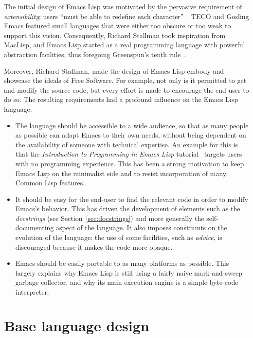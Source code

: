 \documentclass[format=acmsmall, review]{acmart}
\newcommand \Elisp {Emacs Lisp}
\begin{document}
The initial design of \Elisp{} was motivated by the pervasive
requirement of \emph{extensibility}; users ``must be able to
redefine each character''~\cite{Stallman1981}.  TECO and Gosling Emacs
featured small languages that were either too obscure or too weak to
support this vision.  Consequently, Richard Stallman took inspiration from
MacLisp, and \Elisp{} started as a real programming language with
powerful abstraction facilities, thus foregoing Greenspun's tenth
rule~\cite{GreenspunsRule}.

Moreover, Richard Stallman, made the design of \Elisp{}
embody and showcase the ideals of Free Software.  For example, not only
is it permitted to get and modify the source code, but every effort
is made to encourage the end-user to do so.  The resulting requirements had a profound
influence on the \Elisp{} language:
\begin{itemize}
\item The language should be accessible to a wide audience, so that as many
  people as possible can adapt Emacs to their own needs, without being
  dependent on the availability of someone with technical expertise.
  An example for this is that the
  \emph{Introduction to Programming in Emacs Lisp}
  tutorial~\citep{ElispIntro} targets users with no programming
  experience.  This has been a strong motivation to keep \Elisp{} on the
  minimalist side and to resist incorporation of many Common Lisp features.
\item It should be easy for the end-user to find the relevant code in order
  to modify Emacs's behavior.  This has driven the development of elements
  such as the \emph{docstrings} (see Section~\ref{sec:docstrings}) and more generally the self-documenting
  aspect of the language.  It also imposes constraints on the evolution of
  the language: the use of some facilities, such as \emph{advice}, is
  discouraged because it makes the code more opaque.
\item Emacs should be easily portable to as many platforms as possible.
  This largely explains why \Elisp{} is still using a fairly naive
  mark-and-sweep garbage collector, and why its main execution engine is
  a simple byte-code interpreter.
\end{itemize}

\section{Base language design}
\label{sec:base-language-design}
\end{document}
